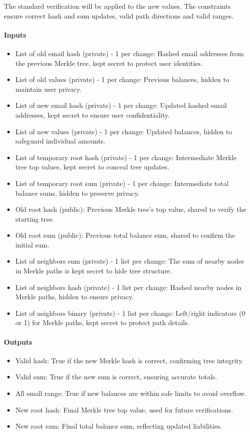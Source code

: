 The standard verification will be applied to the new values.
The constraints ensure correct hash and sum updates, valid path directions and valid ranges.

\paragraph{Inputs}
\begin{itemize}
   \item List of old email hash (private) - 1 per change: Hashed email addresses from the previous Merkle tree, kept secret to protect user identities.
   \item List of old values (private) - 1 per change: Previous balances, hidden to maintain user privacy.
   \item List of new email hash (private) - 1 per change: Updated hashed email addresses, kept secret to ensure user confidentiality.
   \item List of new values (private) - 1 per change: Updated balances, hidden to safeguard individual amounts.
   \item List of temporary root hash (private) - 1 per change: Intermediate Merkle tree top values, kept secret to conceal tree updates.
   \item List of temporary root sum (private) - 1 per change: Intermediate total balance sums, hidden to preserve privacy.
   \item Old root hash (public): Previous Merkle tree's top value, shared to verify the starting tree.
   \item Old root sum (public): Previous total balance sum, shared to confirm the initial sum.
   \item List of neighbors sum (private) - 1 list per change: The sum of nearby nodes in Merkle paths is kept secret to hide tree structure.
   \item List of neighbors hash (private) - 1 list per change: Hashed nearby nodes in Merkle paths, hidden to ensure privacy.
   \item List of neighbors binary (private) - 1 list per change: Left/right indicators (0 or 1) for Merkle paths, kept secret to protect path details.
\end{itemize}

\paragraph{Outputs}
\begin{itemize}
   \item Valid hash: True if the new Merkle hash is correct, confirming tree integrity.
   \item Valid sum: True if the new sum is correct, ensuring accurate totals.
   \item All small range: True if new balances are within safe limits to avoid overflow.
   \item New root hash: Final Merkle tree top value, used for future verifications.
   \item New root sum: Final total balance sum, reflecting updated liabilities.
   \end{itemize}

